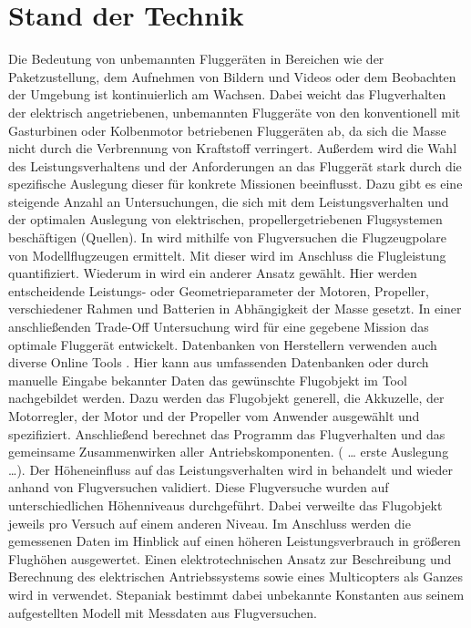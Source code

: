 \section{Stand der Technik}
\label{sec:stand_der_technik}
Die Bedeutung von unbemannten Fluggeräten in Bereichen wie der Paketzustellung, dem Aufnehmen von Bildern und Videos oder dem Beobachten der Umgebung ist kontinuierlich am Wachsen. Dabei weicht das Flugverhalten der elektrisch angetriebenen, unbemannten Fluggeräte von den konventionell mit Gasturbinen oder Kolbenmotor betriebenen Fluggeräten ab, da sich die Masse nicht durch die Verbrennung von Kraftstoff verringert. Außerdem wird die Wahl des Leistungsverhaltens und der Anforderungen an das Fluggerät stark durch die spezifische Auslegung dieser für konkrete Missionen beeinflusst. 
Dazu gibt es eine steigende Anzahl an Untersuchungen, die sich mit dem Leistungsverhalten und der optimalen Auslegung von elektrischen, propellergetriebenen Flugsystemen beschäftigen (Quellen). In \cite{Ostler.2006} wird mithilfe von Flugversuchen die Flugzeugpolare von Modellflugzeugen ermittelt. Mit dieser wird im Anschluss die Flugleistung quantifiziert. Wiederum in \cite{KARI.2017} wird ein anderer Ansatz gewählt. Hier werden entscheidende Leistungs- oder Geometrieparameter der Motoren, Propeller, verschiedener Rahmen und Batterien in Abhängigkeit der Masse gesetzt. In einer anschließenden Trade-Off Untersuchung wird für eine gegebene Mission das optimale Fluggerät entwickelt. Datenbanken von Herstellern verwenden auch diverse Online Tools \cite{Drivecalc,eCalc,Flyeval}. Hier kann aus umfassenden Datenbanken oder durch manuelle Eingabe bekannter Daten das gewünschte Flugobjekt im Tool nachgebildet werden. Dazu werden das Flugobjekt generell, die Akkuzelle, der Motorregler, der Motor und der Propeller vom Anwender ausgewählt und spezifiziert. Anschließend berechnet das Programm das Flugverhalten und das gemeinsame Zusammenwirken aller Antriebskomponenten. ( … erste Auslegung …). Der Höheneinfluss auf das Leistungsverhalten wird in \cite{PCUP.2017} behandelt und wieder anhand von Flugversuchen validiert. Diese Flugversuche wurden auf unterschiedlichen Höhenniveaus durchgeführt. Dabei verweilte das Flugobjekt jeweils pro Versuch auf einem anderen Niveau. Im Anschluss werden die gemessenen Daten im Hinblick auf einen höheren Leistungsverbrauch in größeren Flughöhen ausgewertet. Einen elektrotechnischen Ansatz zur Beschreibung und Berechnung des elektrischen Antriebssystems sowie eines Multicopters als Ganzes wird in \cite{Quan.2017,Shi.2017,Stepaniak.2009} verwendet. Stepaniak bestimmt dabei unbekannte Konstanten aus seinem aufgestellten Modell mit Messdaten aus Flugversuchen. 
